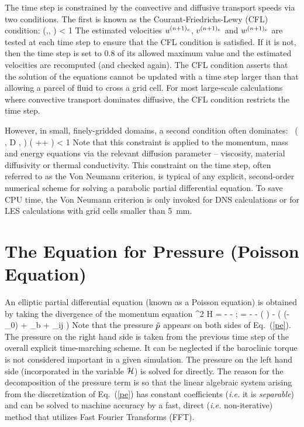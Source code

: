\label{stability}

The time step is constrained by the convective and diffusive
transport speeds via two conditions. The first is known as the
Courant-Friedrichs-Lewy (CFL) condition:
\be \dt \; \max \left(,, \right) < 1  \label{cfl} \ee
The estimated velocities
$u^{(n+1)_e}$, $v^{(n+1)_e}$ and $w^{(n+1)_e}$ are tested at each
time step to ensure that the CFL condition is satisfied. If it is not,
then the time step is set to 0.8 of its allowed maximum value
and the estimated velocities are recomputed (and checked again).
The CFL condition asserts that the solution of the equations cannot be updated with a time step
larger than that allowing a parcel of fluid to cross a grid cell. For most large-scale calculations where
convective transport dominates diffusive, the CFL condition restricts the time step.

However, in small, finely-gridded domains, a second condition often dominates:
 \, \max \left( \nu , D ,  \right)  \; \dt  \left(
              ++ \right) < 1  \label{vn} \ee
Note that this constraint is applied to the momentum, mass and energy equations via the
relevant diffusion parameter -- viscosity, material diffusivity or thermal conductivity.
This constraint on the time step, often referred to as the Von Neumann criterion, is typical
of any explicit, second-order numerical scheme for solving a parabolic partial differential
equation. To save CPU time, the Von Neumann criterion is only invoked for DNS calculations or for LES
calculations with grid cells smaller than 5~mm.

\clearpage
\section{The Equation for Pressure (Poisson Equation)}

An elliptic partial differential equation (known as a Poisson equation) is obtained by
taking the divergence of the momentum equation
\be \nabla^2 {\cal H} =
     - - \nabla\!\cdot \bF
    \quad ; \quad \bF = - \bu\times\bo - \tp \nabla \left(  \right) - 
    \Big( (\rho-\rho_0) \bg + \bof_b + \nabla\!\cdot \btau_{ij} \Big)
   \label{pe}\ee
Note that the pressure $\tilde{p}$ appears on both sides of Eq.~(\ref{pe}). The
pressure on the right hand side is taken from the previous time step of the
overall explicit time-marching scheme. It can be neglected if the baroclinic torque is
not considered important in a given simulation. The pressure on the left hand side (incorporated
in the variable $\cal H$) is solved for directly.
The reason for the decomposition of the pressure term is so that the linear algebraic system
arising from the discretization of Eq.~(\ref{pe})
has constant coefficients ({\em i.e.} it is {\em separable}) and can be solved to machine accuracy
by a fast, direct ({\em i.e.} non-iterative) method that utilizes
Fast Fourier Transforms (FFT).


